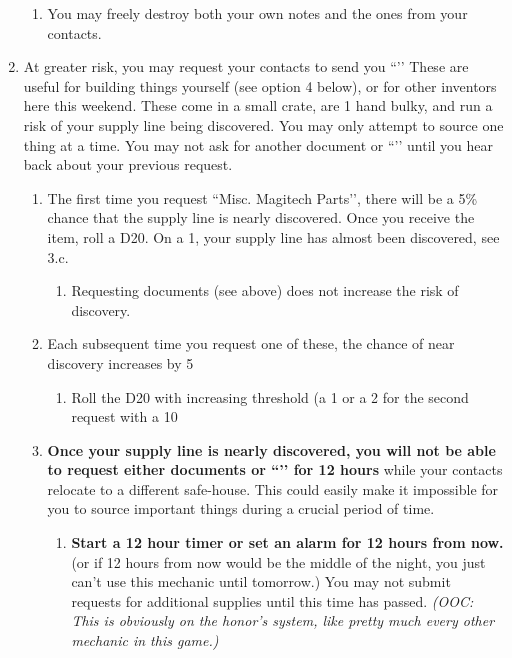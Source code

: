 \documentclass[green]{GL2020}
\begin{document}
\begin{enumerate}
\begin{enumerate}
    \item You may freely destroy both your own notes and the ones from your contacts.
  \end{enumerate}
  \item At greater risk, you may request your contacts to send you ``\iMagitechParts{}’’ These are useful for building things yourself (see option 4 below), or for other inventors here this weekend. These come in a small crate, are 1 hand bulky, and run a risk of your supply line being discovered. You may only attempt to source one thing at a time. You may not ask for another document or ``\iMagitechParts{}’’ until you hear back about your previous request.
  \begin{enumerate}
    \item The first time you request ``Misc. Magitech Parts’’, there will be a 5\% chance that the supply line is nearly discovered. Once you receive the item, roll a D20. On a 1, your supply line has almost been discovered, see 3.c.
    \begin{enumerate}
       \item Requesting documents (see above) does not increase the risk of discovery.
    \end{enumerate}
    \item Each subsequent time you request one of these, the chance of near discovery increases by 5%
    \begin{enumerate}
       \item Roll the D20 with increasing threshold (a 1 or a 2 for the second request with a 10%
    \end{enumerate}
    \item \textbf{Once your supply line is nearly discovered, you will not be able to request either documents or ``\iMagitechParts{}’’ for 12 hours} while your contacts relocate to a different safe-house. This could easily make it impossible for you to source important things during a crucial period of time. 
    \begin{enumerate}
      \item \textbf{Start a 12 hour timer or set an alarm for 12 hours from now.} (or if 12 hours from now would be the middle of the night, you just can’t use this mechanic until tomorrow.) You may not submit requests for additional supplies until this time has passed. \emph{(OOC: This is obviously on the honor’s system, like pretty much every other mechanic in this game.)}
    \end{enumerate}

\end{enumerate}
\end{enumerate}
\end{document}
